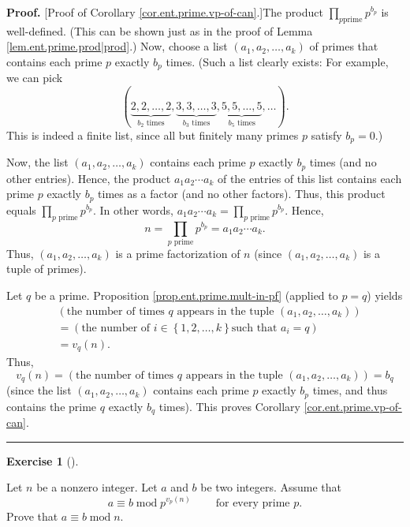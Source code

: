 \documentclass[numbers=enddot,12pt,final,onecolumn,notitlepage]{scrartcl}%
\newcounter{exer}
\numberwithin{exer}{subsection}
\theoremstyle{definition}
\newtheorem{exmp}[exer]{Exercise}
\newenvironment{exercise}[1][]
{\begin{exmp}[#1]\begin{leftbar}}
{\end{leftbar}\end{exmp}}
\newenvironment{proof}[1][Proof]{\noindent\textbf{#1.} }{\ \rule{0.5em}{0.5em}}
\let\prodnonlimits\prod
\renewcommand{\prod}{\prodnonlimits\limits}
\begin{document}
\begin{proof}
[Proof of Corollary \ref{cor.ent.prime.vp-of-can}.]The product $\prod_{p\text{
prime}}p^{b_{p}}$ is well-defined. (This can be shown just as in the proof of
Lemma \ref{lem.ent.prime.prod|prod}.) Now, choose a list $\left(  a_{1}%
,a_{2},\ldots,a_{k}\right)  $ of primes that contains each prime $p$ exactly
$b_{p}$ times. (Such a list clearly exists: For example, we can pick%
\[
\left(  \underbrace{2,2,\ldots,2}_{b_{2}\text{ times}},\underbrace{3,3,\ldots
,3}_{b_{3}\text{ times}},\underbrace{5,5,\ldots,5}_{b_{5}\text{ times}}%
,\ldots\right)  .
\]
This is indeed a finite list, since all but finitely many primes $p$ satisfy
$b_{p}=0$.)

Now, the list $\left(  a_{1},a_{2},\ldots,a_{k}\right)  $ contains each prime
$p$ exactly $b_{p}$ times (and no other entries). Hence, the product
$a_{1}a_{2}\cdots a_{k}$ of the entries of this list contains each prime $p$
exactly $b_{p}$ times as a factor (and no other factors). Thus, this product
equals $\prod_{p\text{ prime}}p^{b_{p}}$. In other words, $a_{1}a_{2}\cdots
a_{k}=\prod_{p\text{ prime}}p^{b_{p}}$. Hence,%
\[
n=\prod_{p\text{ prime}}p^{b_{p}}=a_{1}a_{2}\cdots a_{k}.
\]
Thus, $\left(  a_{1},a_{2},\ldots,a_{k}\right)  $ is a prime factorization of
$n$ (since $\left(  a_{1},a_{2},\ldots,a_{k}\right)  $ is a tuple of primes).

Let $q$ be a prime. Proposition \ref{prop.ent.prime.mult-in-pf} (applied to
$p=q$) yields%
\begin{align*}
&  \left(  \text{the number of times }q\text{ appears in the tuple }\left(
a_{1},a_{2},\ldots,a_{k}\right)  \right) \\
&  =\left(  \text{the number of }i\in\left\{  1,2,\ldots,k\right\}  \text{
such that }a_{i}=q\right) \\
&  =v_{q}\left(  n\right)  .
\end{align*}
Thus,%
\[
v_{q}\left(  n\right)  =\left(  \text{the number of times }q\text{ appears in
the tuple }\left(  a_{1},a_{2},\ldots,a_{k}\right)  \right)  =b_{q}%
\]
(since the list $\left(  a_{1},a_{2},\ldots,a_{k}\right)  $ contains each
prime $p$ exactly $b_{p}$ times, and thus contains the prime $q$ exactly
$b_{q}$ times). This proves Corollary \ref{cor.ent.prime.vp-of-can}.
\end{proof}

\begin{exercise}
\label{exe.ent.prime.modpvp}Let $n$ be a nonzero integer. Let $a$ and $b$ be
two integers. Assume that%
\begin{equation}
a\equiv b\operatorname{mod}p^{v_{p}\left(  n\right)  }%
\ \ \ \ \ \ \ \ \ \ \text{for every prime }p.
\label{eq.exe.ent.prime.modpvp.ass}%
\end{equation}
Prove that $a\equiv b\operatorname{mod}n$.
\end{exercise}
\end{document}
